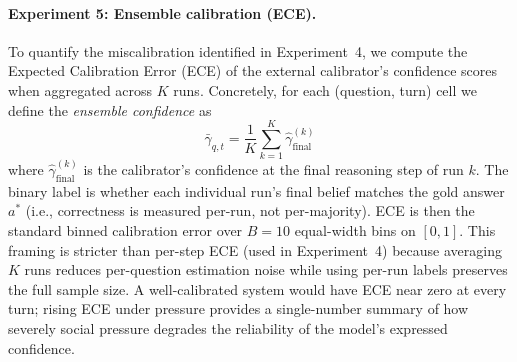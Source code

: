 \paragraph{Experiment 5: Ensemble calibration (ECE).}
To quantify the miscalibration identified in Experiment~4, we compute the Expected Calibration Error (ECE) of the external calibrator's confidence scores when aggregated across $K$ runs. Concretely, for each (question, turn) cell we define the \emph{ensemble confidence} as
\[
  \bar\gamma_{q,t} = \frac{1}{K}\sum_{k=1}^{K} \hat\gamma^{(k)}_{\text{final}}
\]
where $\hat\gamma^{(k)}_{\text{final}}$ is the calibrator's confidence at the
final reasoning step of run $k$.
The binary label is whether each individual run's final belief matches the
gold answer $a^*$ (i.e., correctness is measured per-run, not per-majority).
ECE is then the standard binned calibration error
over $B = 10$ equal-width bins on $[0,1]$. This framing is stricter than per-step ECE (used in Experiment~4) because averaging $K$ runs reduces per-question estimation noise while using per-run labels preserves the full sample size. A well-calibrated system would have ECE near zero at every turn; rising ECE under pressure provides a single-number summary of how severely social pressure degrades the reliability of the model's expressed confidence.

